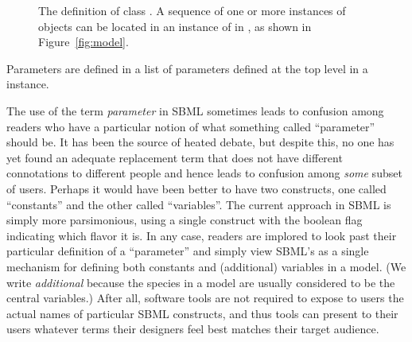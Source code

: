 \begin{figure}[htb]
  \centering
  \small
  \vspace{1ex}
  \caption{The definition of class \Parameter.  A
      sequence of one or more instances of \Parameter objects can
      be located in an instance of \ListOfParameters in \Model, as
      shown in Figure~\protect\ref{fig:model}.}
  \label{fig:parameter}
\end{figure}

Parameters are defined in a list of
parameters defined at the top level in a \Model
instance.

The use of the term \emph{parameter} in SBML sometimes leads to
confusion among readers who have a particular notion of what
something called ``parameter'' should be.  It has been the source
of heated debate, but despite this, no one has yet found an
adequate replacement term that does not have different
connotations to different people and hence leads to confusion
among \emph{some} subset of users.  Perhaps it would have been
better to have two constructs, one called ``constants'' and the
other called ``variables''.  The current approach in SBML is
simply more parsimonious, using a single \Parameter construct with
the boolean flag  indicating which flavor it is.
In any case, readers are implored to look past their particular
definition of a ``parameter'' and simply view SBML's \Parameter as
a single mechanism for defining both constants and (additional)
variables in a model.  (We write \emph{additional} because the
species in a model are usually considered to be the central
variables.)  After all, software tools are not required to expose
to users the actual names of particular SBML constructs, and thus
tools can present to their users whatever terms their designers
feel best matches their target audience.


